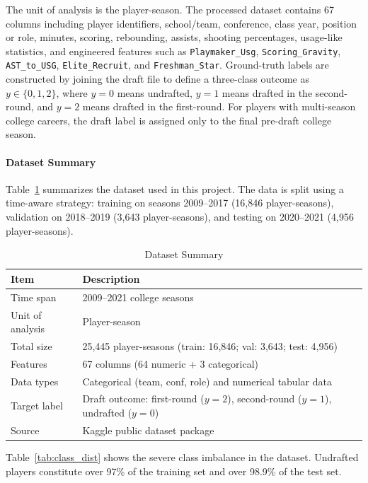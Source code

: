 The unit of analysis is the player-season. The processed dataset contains 67 columns including player identifiers, school/team, conference, class year, position or role, minutes, scoring, rebounding, assists, shooting percentages, usage-like statistics, and engineered features such as \texttt{Playmaker\_Usg}, \texttt{Scoring\_Gravity}, \texttt{AST\_to\_USG}, \texttt{Elite\_Recruit}, and \texttt{Freshman\_Star}. Ground-truth labels are constructed by joining the draft file to define a three-class outcome as $y \in \{0,1,2\}$, where $y = 0$ means undrafted, $y = 1$ means drafted in the second-round, and $y = 2$ means drafted in the first-round. For players with multi-season college careers, the draft label is assigned only to the final pre-draft college season.

\paragraph{Dataset Summary}
Table~\ref{tab:dataset_summary} summarizes the dataset used in this project. The data is split using a time-aware strategy: training on seasons 2009--2017 (16,846 player-seasons), validation on 2018--2019 (3,643 player-seasons), and testing on 2020--2021 (4,956 player-seasons).

\begin{table}[h]
\caption{Dataset Summary}
\label{tab:dataset_summary}
\centering
\begin{tabularx}{\columnwidth}{|l|X|}
\hline
\textbf{Item} & \textbf{Description} \\
\hline
Time span & 2009--2021 college seasons \\
\hline
Unit of analysis & Player-season \\
\hline
Total size & 25,445 player-seasons (train: 16,846; val: 3,643; test: 4,956) \\
\hline
Features & 67 columns (64 numeric + 3 categorical) \\
\hline
Data types & Categorical (team, conf, role) and numerical tabular data \\
\hline
Target label & Draft outcome: first-round ($y{=}2$), second-round ($y{=}1$), undrafted ($y{=}0$) \\
\hline
Source & Kaggle public dataset package \\
\hline
\end{tabularx}
\end{table}

Table~\ref{tab:class_dist} shows the severe class imbalance in the dataset. Undrafted players constitute over 97\% of the training set and over 98.9\% of the test set.

